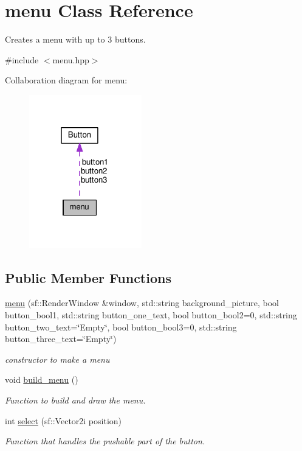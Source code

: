 \hypertarget{classmenu}{}\section{menu Class Reference}
\label{classmenu}


Creates a menu with up to 3 buttons.  




{\ttfamily \#include $<$menu.\+hpp$>$}



Collaboration diagram for menu\+:\nopagebreak
\begin{figure}[H]
\begin{center}
\leavevmode
\includegraphics[width=139pt]{classmenu__coll__graph}
\end{center}
\end{figure}
\subsection*{Public Member Functions}
\begin{DoxyCompactItemize}
\item 
\hyperlink{classmenu_a1c6f1319ba2123f9654df695725e83b4}{menu} (sf\+::\+Render\+Window \&window, std\+::string background\+\_\+picture, bool button\+\_\+bool1, std\+::string button\+\_\+one\+\_\+text, bool button\+\_\+bool2=0, std\+::string button\+\_\+two\+\_\+text=\char`\"{}Empty\char`\"{}, bool button\+\_\+bool3=0, std\+::string button\+\_\+three\+\_\+text=\char`\"{}Empty\char`\"{})
\begin{DoxyCompactList}\small\item\em constructor to make a menu \end{DoxyCompactList}\item 
void \hyperlink{classmenu_a8d194b462b1b180086e5b06a2dbfbdff}{build\+\_\+menu} ()
\begin{DoxyCompactList}\small\item\em Function to build and draw the menu. \end{DoxyCompactList}\item 
int \hyperlink{classmenu_a06744d58a2aad693d3637d0485aa7984}{select} (sf\+::\+Vector2i position)
\begin{DoxyCompactList}\small\item\em Function that handles the pushable part of the button. \end{DoxyCompactList}\end{DoxyCompactItemize}
